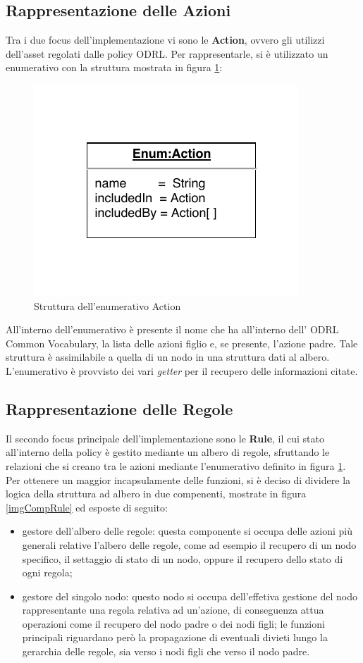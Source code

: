 \documentclass[12pt,a4paper,twoside]{book}
\begin{document}
\subsection{Rappresentazione delle Azioni}\label{enumAction}
Tra i due focus dell'implementazione vi sono le \textbf{Action}, ovvero gli utilizzi dell'asset regolati dalle policy ODRL. Per rappresentarle, si è utilizzato un enumerativo con la struttura mostrata in figura \ref{imgActionEnum}:
\begin{figure}[H]
\centering
\includegraphics[scale=1.00]{../immagini/enumAction}
\caption{Struttura dell'enumerativo Action}
\label{imgActionEnum}
\end{figure}
All'interno dell'enumerativo è presente il nome che ha all'interno dell' ODRL Common Vocabulary, la lista delle azioni figlio e, se presente, l'azione padre. Tale struttura è assimilabile a quella di un nodo in una struttura dati al albero. L'enumerativo è provvisto dei vari \textit{getter} per il recupero delle informazioni citate.
\subsection{Rappresentazione delle Regole}\label{ruleRappr}
Il secondo focus principale dell'implementazione sono le \textbf{Rule}, il cui stato all'interno della policy è gestito mediante un albero di regole, sfruttando le relazioni che si creano tra le azioni mediante l'enumerativo definito in figura \ref{imgActionEnum}. Per ottenere un maggior incapsulamente delle funzioni, si è deciso di dividere la logica della struttura ad albero in due compenenti, mostrate in figura \ref{imgCompRule} ed esposte di seguito:
\begin{itemize}
\item gestore dell'albero delle regole: questa componente si occupa delle azioni più generali relative l'albero delle regole, come ad esempio il recupero di un nodo specifico, il settaggio di stato di un nodo, oppure il recupero dello stato di ogni regola;
\item gestore del singolo nodo: questo nodo si occupa dell'effetiva gestione del nodo rappresentante una regola relativa ad un'azione, di conseguenza attua operazioni come il recupero del nodo padre o dei nodi figli; le funzioni principali riguardano però la propagazione di eventuali divieti lungo la gerarchia delle regole, sia verso i nodi figli che verso il nodo padre.
\end{itemize}
\end{document}
